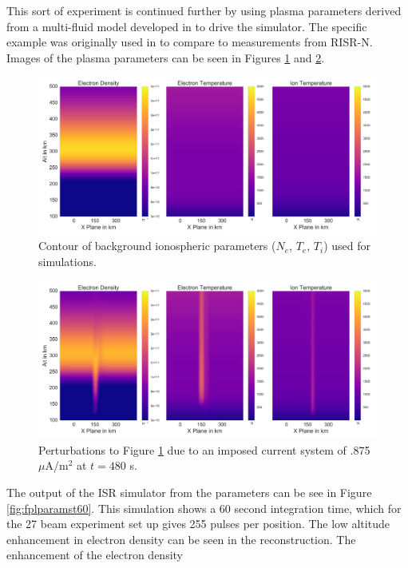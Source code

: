 \documentclass[draft,ras]{agutex}
\begin{document}
\begin{article}
This sort of experiment is continued further by using plasma parameters derived from a multi-fluid model developed in \cite{semeter:plasmatransport2012} to drive the simulator. The specific example was originally used in \cite{Perry:2015jf} to compare to measurements from RISR-N. Images of the plasma parameters can be seen in Figures \ref{fig:plparamst0} and \ref{fig:plparamst60}.

\begin{figure}[!t]
\centering
\includegraphics[width=5in]{000_inputdata}
\caption{Contour of background ionospheric parameters ($N_e$, $T_e$, $T_i$) used for simulations.}
\label{fig:plparamst0}
\end{figure}

\begin{figure}[!t]
\centering
\includegraphics[width=5in]{0480_input}
\caption{Perturbations to Figure \ref{fig:plparamst0} due to an imposed current system of .875 $\mu$A/m$^2$ at $t=480$ s.}
\label{fig:plparamst60}
\end{figure}



The output of the ISR simulator from the parameters can be see in Figure  \ref{fig:fplparamst60}. This simulation shows a 60 second integration time, which for the 27 beam experiment set up gives 255 pulses per position. The low altitude enhancement in electron density can be seen in the reconstruction. The enhancement of the electron density


\end{article}
\end{document}
